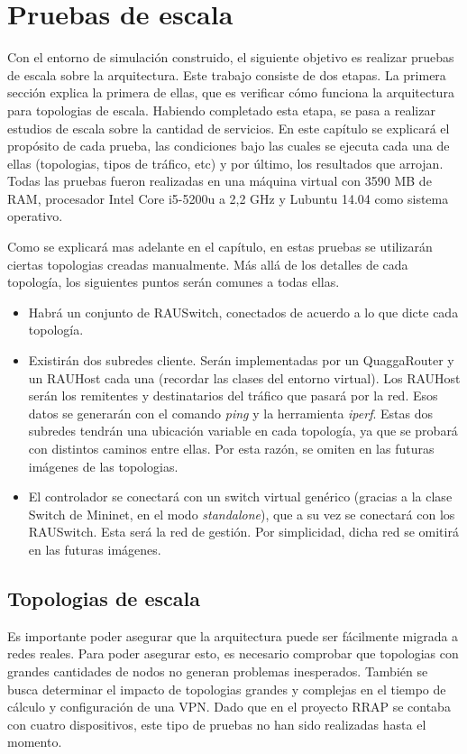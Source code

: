 \chapter{Pruebas de escala}
Con el entorno de simulación construido, el siguiente objetivo es realizar pruebas de escala sobre la arquitectura. Este trabajo consiste de dos etapas. La primera sección explica la primera de ellas, que es verificar cómo funciona la arquitectura para topologias de escala. Habiendo completado esta etapa, se pasa a realizar estudios de escala sobre la cantidad de servicios. En este capítulo se explicará el propósito de cada prueba, las condiciones bajo las cuales se ejecuta cada una de ellas (topologias, tipos de tráfico, etc) y por último, los resultados que arrojan. Todas las pruebas fueron realizadas en una máquina virtual con 3590 MB de RAM, procesador Intel Core i5-5200u a 2,2 GHz y Lubuntu 14.04 como sistema operativo.

Como se explicará mas adelante en el capítulo, en estas pruebas se utilizarán ciertas topologias creadas manualmente. Más allá de los detalles de cada topología, los siguientes puntos serán comunes a todas ellas.
\begin{itemize}
	\item Habrá un conjunto de RAUSwitch, conectados de acuerdo a lo que dicte cada topología.
	\item Existirán dos subredes cliente. Serán implementadas por un QuaggaRouter y un RAUHost cada una (recordar las clases del entorno virtual). Los RAUHost serán los remitentes y destinatarios del tráfico que pasará por la red. Esos datos se generarán con el comando \textit{ping} y la herramienta \textit{iperf}. Estas dos subredes tendrán una ubicación variable en cada topología, ya que se probará con distintos caminos entre ellas. Por esta razón, se omiten en las futuras imágenes de las topologias.
	\item El controlador se conectará con un switch virtual genérico (gracias a la clase Switch de Mininet, en el modo \textit{standalone}), que a su vez se conectará con los RAUSwitch. Esta será la red de gestión. Por simplicidad, dicha red se omitirá en las futuras imágenes.
\end{itemize}

\section{Topologias de escala}
Es importante poder asegurar que la arquitectura puede ser fácilmente migrada a redes reales. Para poder asegurar esto, es necesario comprobar que topologias con grandes cantidades de nodos no generan problemas inesperados. También se busca determinar el impacto de topologias grandes y complejas en el tiempo de cálculo y configuración de una VPN. Dado que en el proyecto RRAP se contaba con cuatro dispositivos, este tipo de pruebas no han sido realizadas hasta el momento.


